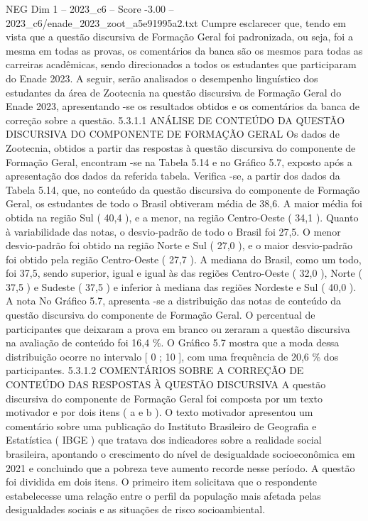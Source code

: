 \begin{textsample}{NEG Dim 1 – 2023\_c6 – Score -3.00 – 2023\_c6/enade\_2023\_zoot\_a5e91995a2.txt}
Cumpre esclarecer que, tendo em vista que a questão discursiva de Formação Geral foi padronizada, ou seja, foi a mesma em todas as provas, os comentários da banca são os mesmos para todas as carreiras acadêmicas, sendo direcionados a todos os estudantes que participaram do Enade 2023.
A seguir, serão analisados o desempenho linguístico dos estudantes da área de Zootecnia na questão discursiva de Formação Geral do Enade 2023, apresentando -se os resultados obtidos e os comentários da banca de correção sobre a questão. 5.3.1.1 ANÁLISE DE CONTEÚDO DA QUESTÃO DISCURSIVA DO COMPONENTE DE FORMAÇÃO GERAL Os dados de Zootecnia, obtidos a partir das respostas à questão discursiva do componente de Formação Geral, encontram -se na Tabela 5.14 e no Gráfico 5.7, exposto após a apresentação dos dados da referida tabela.
Verifica -se, a partir dos dados da Tabela 5.14, que, no conteúdo da questão discursiva do componente de Formação Geral, os estudantes de todo o Brasil obtiveram média de 38,6.
A maior média foi obtida na região Sul ( 40,4 ), e a menor, na região Centro-Oeste ( 34,1 ).
Quanto à variabilidade das notas, o desvio-padrão de todo o Brasil foi 27,5.
O menor desvio-padrão foi obtido na região Norte e Sul ( 27,0 ), e o maior desvio-padrão foi obtido pela região Centro-Oeste ( 27,7 ).
A mediana do Brasil, como um todo, foi 37,5, sendo superior, igual e igual às das regiões Centro-Oeste ( 32,0 ), Norte ( 37,5 ) e Sudeste ( 37,5 ) e inferior à mediana das regiões Nordeste e Sul ( 40,0 ).
A nota No Gráfico 5.7, apresenta -se a distribuição das notas de conteúdo da questão discursiva do componente de Formação Geral.
O percentual de participantes que deixaram a prova em branco ou zeraram a questão discursiva na avaliação de conteúdo foi 16,4 \%.
O Gráfico 5.7 mostra que a moda dessa distribuição ocorre no intervalo [ 0 ; 10 ], com uma frequência de 20,6 \% dos participantes. 5.3.1.2 COMENTÁRIOS SOBRE A CORREÇÃO DE CONTEÚDO DAS RESPOSTAS À QUESTÃO DISCURSIVA A questão discursiva do componente de Formação Geral foi composta por um texto motivador e por dois itens ( a e b ).
O texto motivador apresentou um comentário sobre uma publicação do Instituto Brasileiro de Geografia e Estatística ( IBGE ) que tratava dos indicadores sobre a realidade social brasileira, apontando o crescimento do nível de desigualdade socioeconômica em 2021 e concluindo que a pobreza teve aumento recorde nesse período.
A questão foi dividida em dois itens.
O primeiro item solicitava que o respondente estabelecesse uma relação entre o perfil da população mais afetada pelas desigualdades sociais e as situações de risco socioambiental.

\end{textsample}
